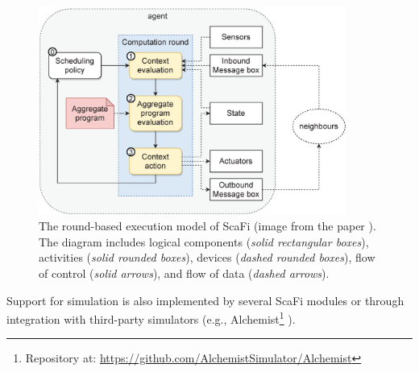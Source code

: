 \begin{figure}[!ht]
  \centering
  \includegraphics[width=0.90\textwidth]{resources/figures/round-based-execution-model.pdf}
  \caption[The round-based execution model of ScaFi]{
    The round-based execution model of ScaFi (image from the paper
    \cite{RoundBasedExecution}). The diagram includes logical components
    (\textit{solid rectangular boxes}), activities (\textit{solid rounded boxes}),
    devices (\textit{dashed rounded boxes}), flow of control (\textit{solid arrows}),
    and flow of data (\textit{dashed arrows}).
  }
  \label{figure:round-based-execution-model}
\end{figure}

Support for simulation is also implemented by several \ac{ScaFi} modules or
through integration with third-party simulators (e.g.,
Alchemist\footnote{Repository at:
\url{https://github.com/AlchemistSimulator/Alchemist}} \cite{Alchemist}).
